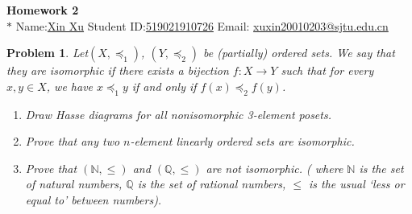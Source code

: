 \documentclass[12pt]{article}
\date{Feb 14, 2012}
\newtheorem{hw}{Problem}
\begin{document}
\begin{center}
{\LARGE\bf Homework 2}\\
\vspace{2mm}
\footnotesize{$*$ Name:\underline{Xin Xu}  \quad Student ID:\underline{519021910726} \quad Email: \underline{xuxin20010203@sjtu.edu.cn}}
\vspace{2mm}
\end{center}


\begin{hw}
Let$(X,\preceq_1)$, $(Y,\preceq_2)$ be (partially) ordered sets. We say that they are \emph{isomorphic} if there exists a bijection $f:X\rightarrow Y$ such that for every $x,y\in X$, we have $x\preceq_1 y$ if and only if $f(x)\preceq_2 f(y)$.
\begin{enumerate}
  \item Draw Hasse diagrams for all nonisomorphic 3-element posets.
  \item Prove that any two $n$-element linearly ordered sets are isomorphic.
  \item Prove that $(\mathbb{N},\leq)$ and $(\mathbb{Q},\leq)$ are not isomorphic. ( where $\mathbb{N}$ is the set of natural numbers, $\mathbb{Q}$ is the set of rational numbers, $\leq$ is the usual `less or equal to' between numbers).
\end{enumerate}


\end{hw}
\end{document}
